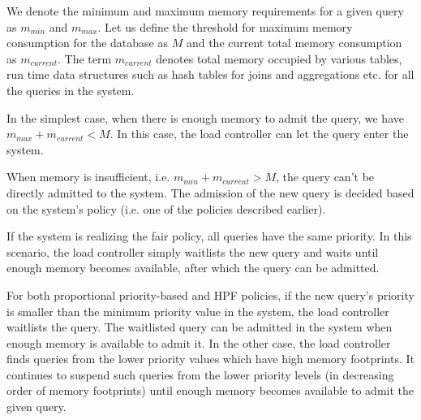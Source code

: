 
We denote the minimum and maximum memory requirements for a given query as $m_{min}$ and $m_{max}$.
Let us define the threshold for maximum memory consumption for the database
as $M$ and the current total memory consumption as $m_{current}$. 
The term $m_{current}$ denotes total memory occupied by various tables, run time data structures such as hash tables for joins and aggregations etc. for all the queries in the system.

In the simplest case, when there is enough memory to admit the query, we have $m_{max} + m_{current} < M$. 
In this case, the load controller can let the query enter the system.

When memory is insufficient, i.e. $m_{min} + m_{current} > M$, the query can't be directly admitted to the system. 
The admission of the new query is decided based on the system's policy (i.e. one of the policies described earlier).

If the system is realizing the fair policy, all queries have the same priority.
In this scenario, the load controller simply waitlists the new query and waits until enough memory becomes available, after which the query can be admitted.

For both proportional priority-based and HPF policies, if the new query's priority is smaller than the minimum priority value in the system, the load controller waitlists the query. 
The waitlisted query can be admitted in the system when enough memory is available to admit it.
In the other case, the load controller finds queries from the lower priority values which have high memory footprints. 
It continues to suspend such queries from the lower priority levels (in decreasing order of memory footprints) until enough memory becomes available to admit the given query. 

